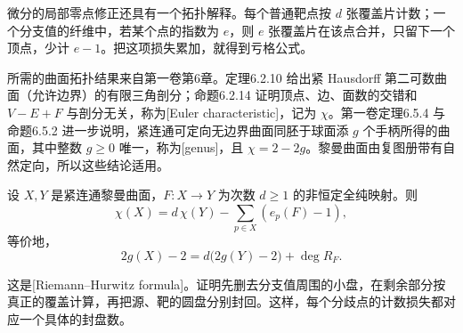 微分的局部零点修正还具有一个拓扑解释。每个普通靶点按 \(d\) 张覆盖片计数；一个分支值的纤维中，若某个点的指数为 \(e\)，则 \(e\) 张覆盖片在该点合并，只留下一个顶点，少计 \(e-1\)。把这项损失累加，就得到亏格公式。

\ProseParagraphBreak

所需的曲面拓扑结果来自第一卷第6章。定理6.2.10 给出紧 Hausdorff 第二可数曲面（允许边界）的有限三角剖分；命题6.2.14 证明顶点、边、面数的交错和 \(V-E+F\) 与剖分无关，称为[Euler characteristic]，记为 \(\chi\)。第一卷定理6.5.4 与命题6.5.2 进一步说明，紧连通可定向无边界曲面同胚于球面添 \(g\) 个手柄所得的曲面，其中整数 \(g\ge0\) 唯一，称为[genus]，且 \(\chi=2-2g\)。黎曼曲面由复图册带有自然定向，所以这些结论适用。

\begin{theorem}
	\label{g4:thm:0203:riemann-hurwitz}
	设 \(X,Y\) 是紧连通黎曼曲面，\(F:X\rightarrow Y\) 为次数 \(d\ge1\) 的非恒定全纯映射。则
	\begin{equation}
		\label{g4:eq:0203:hurwitz-euler}
		\chi(X)=d\,\chi(Y)-\sum_{p\in X}(e_p(F)-1),
	\end{equation}
	等价地，
	\begin{equation}
		\label{g4:eq:0203:riemann-hurwitz}
		2g(X)-2=d\bigl(2g(Y)-2\bigr)+\deg R_F.
	\end{equation}
\end{theorem}

这是[Riemann--Hurwitz formula]。证明先删去分支值周围的小盘，在剩余部分按真正的覆盖计算，再把源、靶的圆盘分别封回。这样，每个分歧点的计数损失都对应一个具体的封盘数。

